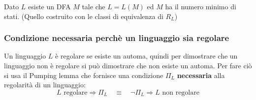 \documentclass[a4paper]{article}
\begin{document}
\begin{theorem}
\begin{itemize}
\begin{itemize}
      \end{itemize}
      Dato \( L \) esiste un DFA \( M \) tale che \( L = L(M) \) ed \( M \) ha il numero
      minimo di stati. (Quello costruito con le classi di equivalenza di \( R_L \))
  \end{itemize}
\end{theorem}


\subsubsection{Condizione necessaria perchè un linguaggio sia regolare}
Un linguaggio \( L \) è regolare se esiste un automa, quindi per dimostrare che
un linguaggio non è regolare si può dimostrare che non esiste un automa. Per fare ciò
si usa il Pumping lemma che fornisce una condizione \( \Pi_L \) \textbf{necessaria}
alla regolarità di un linguaggio:
\[
  L \text{ regolare} \Rightarrow \Pi_L \quad \equiv \quad \neg \Pi_L \Rightarrow L \text{ non regolare}
\] 
\end{document}
